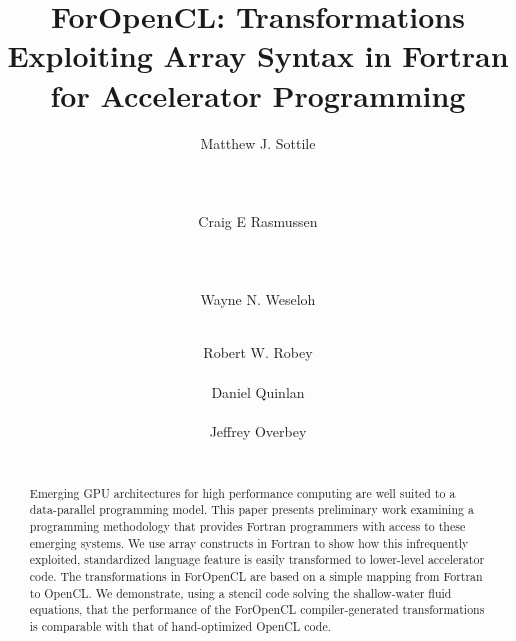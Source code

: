 \documentclass{acm_proc_article-sp}
\begin{document}
\title{ForOpenCL: Transformations Exploiting Array Syntax in Fortran for Accelerator Programming}


\author{
\alignauthor
Matthew J. Sottile\\
       \\
       \\
       \\
\alignauthor
Craig E Rasmussen\\
       \\
       \\
       \\
\alignauthor
Wayne N. Weseloh\\
       \\
\and  %
\alignauthor
Robert W. Robey\\
       \\
\alignauthor
Daniel Quinlan\\
       \\
\alignauthor
Jeffrey Overbey\\
       \\
}

\maketitle

\begin{abstract}
  Emerging GPU architectures for high performance computing are well suited to a
  data-parallel programming model.  This paper presents preliminary work
  examining a programming methodology that provides Fortran programmers with access
  to these emerging systems.  We use array constructs in Fortran to
  show how this infrequently exploited, standardized language feature is easily
  transformed to lower-level accelerator code.  The transformations in ForOpenCL are based
  on a simple mapping from Fortran to OpenCL.  We demonstrate, using a
  stencil code solving the shallow-water fluid equations, that the performance
  of the ForOpenCL compiler-generated transformations is comparable with that of
  hand-optimized OpenCL code.
\end{abstract}
\end{document}
